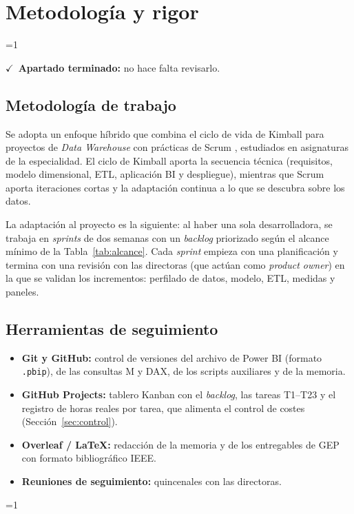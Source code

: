 \documentclass[12pt, a4paper, oneside]{report}
\newcommand{\mostrarterminados}{1}
\newenvironment{revisado}
  {\ifnum\mostrarterminados=1\relax\begin{cajarevisada}\noindent\colorbox{verdeterminado}{\parbox{\dimexpr\linewidth-2\fboxsep\relax}{\small$\checkmark$\ \textbf{Apartado terminado:} no hace falta revisarlo.}}\par\medskip\fi}
  {\ifnum\mostrarterminados=1\relax\end{cajarevisada}\fi}
\begin{document}
\chapter{Metodología y rigor}
\begin{revisado}

\section{Metodología de trabajo}
\label{sec:metodologia}
Se adopta un enfoque híbrido que combina el ciclo de vida de Kimball para proyectos de \textit{Data Warehouse} \cite{kimball2008lifecycle} con prácticas de Scrum \cite{schwaber2020scrum}, estudiados en asignaturas de la especialidad. El ciclo de Kimball aporta la secuencia técnica (requisitos, modelo dimensional, ETL, aplicación BI y despliegue), mientras que Scrum aporta iteraciones cortas y la adaptación continua a lo que se descubra sobre los datos.

La adaptación al proyecto es la siguiente: al haber una sola desarrolladora, se trabaja en \textit{sprints} de dos semanas con un \textit{backlog} priorizado según el alcance mínimo de la Tabla~\ref{tab:alcance}. Cada \textit{sprint} empieza con una planificación y termina con una revisión con las directoras (que actúan como \textit{product owner}) en la que se validan los incrementos: perfilado de datos, modelo, ETL, medidas y paneles.

\section{Herramientas de seguimiento}
\begin{itemize}
    \item \textbf{Git y GitHub:} control de versiones del archivo de Power BI (formato \texttt{.pbip}), de las consultas M y DAX, de los scripts auxiliares y de la memoria.
    \item \textbf{GitHub Projects:} tablero Kanban con el \textit{backlog}, las tareas T1--T23 y el registro de horas reales por tarea, que alimenta el control de costes (Sección~\ref{sec:control}).
    \item \textbf{Overleaf / \LaTeX:} redacción de la memoria y de los entregables de GEP con formato bibliográfico IEEE.
    \item \textbf{Reuniones de seguimiento:} quincenales con las directoras.
\end{itemize}


\end{revisado}
\end{document}
